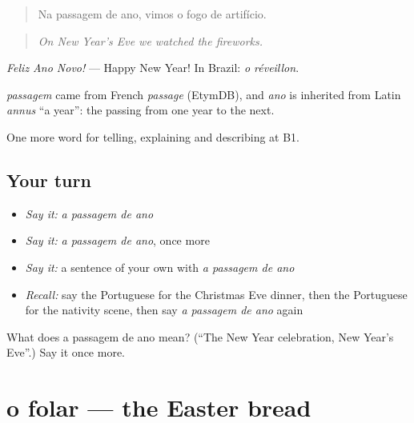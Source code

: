 \begin{quote}
Na passagem de ano, vimos o fogo de artifício.
\end{quote}

\begin{quote}
\emph{On New Year’s Eve we watched the fireworks.}
\end{quote}

\emph{Feliz Ano Novo!} — Happy New Year! In Brazil: \emph{o réveillon}.

\begin{cousinweb}
\emph{passagem} came from French \emph{passage} (EtymDB), and \emph{ano} is inherited from Latin \emph{annus} \textquotedblleft{}a year\textquotedblright{}: the passing from one year to the next.
\end{cousinweb}

\begin{grammarlens}[title={What you've built}]
One more word for telling, explaining and describing at B1.
\end{grammarlens}

\subsection*{Your turn}
\begin{itemize}
\raggedright
  \item \emph{Say it:} \emph{a passagem de ano}
  \item \emph{Say it:} \emph{a passagem de ano}, once more
  \item \emph{Say it:} a sentence of your own with \emph{a passagem de ano}
  \item \emph{Recall:} say the Portuguese for the Christmas Eve dinner, then the Portuguese for the nativity scene, then say \emph{a passagem de ano} again
\end{itemize}

\begin{tcolorbox}[breakable,colback=teal!4,colframe=teal!35!black,title={Before you move on}]
What does a passagem de ano mean? (\textquotedblleft{}The New Year celebration, New Year’s Eve\textquotedblright{}.) Say it once more.
\end{tcolorbox}
\section[o folar]{o folar — the Easter bread}

\label{lesson:PT-C323-folar}



